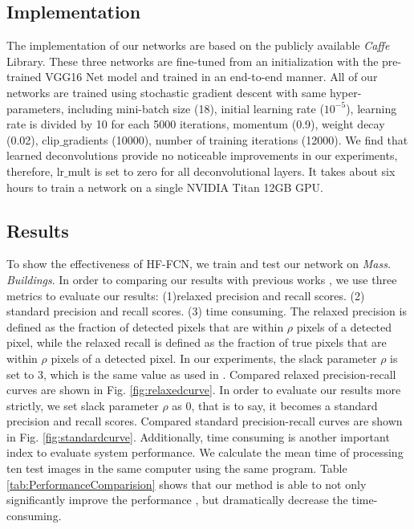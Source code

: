 \documentclass[runningheads]{llncs}
\begin{document}
\subsection{Implementation}
   The implementation of our networks are based on the publicly  available \textit{Caffe} \cite{Jia2014Caffe} Library. These three networks are fine-tuned from an initialization with the pre-trained VGG16 Net model and trained in an end-to-end manner. All of our networks are trained using stochastic gradient descent with same hyper-parameters, including mini-batch size (18), initial learning rate ($10^{-5}$), learning rate is divided by 10 for each 5000 iterations, momentum (0.9), weight decay (0.02), clip$\_$gradients (10000), number of training iterations (12000). We find that learned deconvolutions provide no noticeable improvements in our experiments, therefore,  lr$\_$mult is set to zero for all deconvolutional layers. It takes about six hours to train a network on a single NVIDIA Titan 12GB GPU.

\subsection{Results}
    To show the effectiveness of HF-FCN, we train and test our network on \textit{Mass. Buildings}. In order to comparing our results with previous works \cite{Mnih2013Machine}\cite{Saito2016Multiple}, we use three metrics to evaluate our results: (1)relaxed precision and recall scores. (2) standard precision and recall scores. (3) time consuming.  The relaxed precision is defined as the fraction of detected pixels that are within $\rho$ pixels of a detected pixel, while the relaxed recall is defined as the fraction of true pixels that are within $\rho$ pixels of a detected pixel.  In our  experiments, the slack parameter $\rho$ is set to 3, which is the same value as used in \cite{Mnih2013Machine}\cite{Saito2016Multiple}. Compared relaxed precision-recall curves are shown in  Fig. \ref{fig:relaxedcurve}. In order to evaluate our results more strictly, we set slack parameter $\rho$ as 0, that is to say, it becomes a standard precision and recall scores. Compared standard precision-recall curves are shown in  Fig. \ref{fig:standardcurve}. Additionally, time consuming is another important index to evaluate system performance. We calculate the mean time of processing ten test images in the same computer using the same program. Table \ref{tab:PerformanceComparision} shows that our method is able to not only significantly improve the performance , but dramatically decrease the time-consuming. 
      
\end{document}
